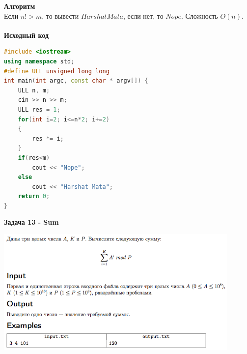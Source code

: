 \documentclass[a4paper,12pt]{article}
\begin{document}
\textbf{{\large Алгоритм}} \\
Если $n! > m$, то вывести $Harshat Mata$, если нет, то $Nope$. Сложность $O(n)$. \\ 
\\
\textbf{{\large Исходный код}}
\begin{lstlisting}[language=C++]
#include <iostream>
using namespace std;
#define ULL unsigned long long
int main(int argc, const char * argv[]) {
    ULL n, m;
    cin >> n >> m;
    ULL res = 1;
    for(int i=2; i<=n*2; i+=2)
    {
        res *= i;
    }
    if(res<m)
        cout << "Nope";
    else
        cout << "Harshat Mata";
    return 0;
}
\end{lstlisting}
\newpage
\textbf{{\large Задача 13 - Sum}} \\
\begin{center}
\includegraphics[width=0.9\textwidth]{OC_Siberia/OC_Siberia_13.png}\\ [1cm]
\end{center}
\newpage
\end{document}
